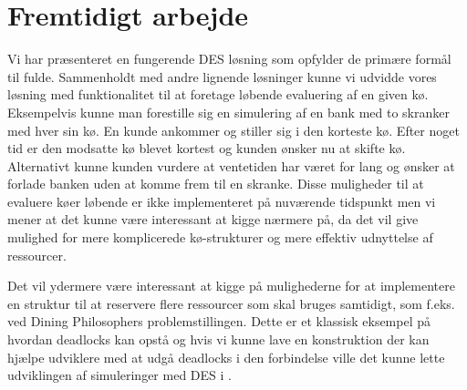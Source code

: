 \section{Fremtidigt arbejde}
Vi har præsenteret en fungerende DES løsning som opfylder de primære formål til fulde. Sammenholdt med andre lignende løsninger kunne vi udvidde vores løsning med funktionalitet til at foretage løbende evaluering af en given kø. Eksempelvis kunne man forestille sig en simulering af en bank med to skranker med hver sin kø. En kunde ankommer og stiller sig i den korteste kø. Efter noget tid er den modsatte kø blevet kortest og kunden ønsker nu at skifte kø. Alternativt kunne kunden vurdere at ventetiden har været for lang og ønsker at forlade banken uden at komme frem til en skranke. Disse muligheder til at evaluere køer løbende er ikke implementeret på nuværende tidspunkt men vi mener at det kunne være interessant at kigge nærmere på, da det vil give mulighed for mere komplicerede kø-strukturer og mere effektiv udnyttelse af ressourcer.

Det vil ydermere være interessant at kigge på mulighederne for at implementere en struktur til at reservere flere ressourcer som skal bruges samtidigt, som f.eks. ved Dining Philosophers problemstillingen. Dette er et klassisk eksempel på hvordan deadlocks kan opstå og hvis vi kunne lave en konstruktion der kan hjælpe udviklere med at udgå deadlocks i den forbindelse ville det kunne lette udviklingen af simuleringer med DES i \pycsp. 

